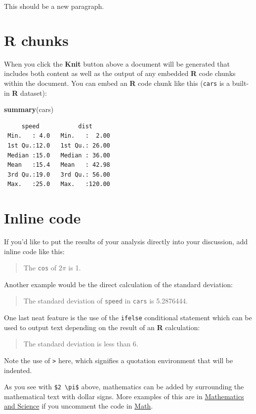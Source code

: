 \documentclass[12pt,twoside]{reedthesis}
\newenvironment{Shaded}{\begin{snugshade}}{\end{snugshade}}
\newcommand{\KeywordTok}[1]{\textcolor[rgb]{0.13,0.29,0.53}{\textbf{#1}}}
\newcommand{\NormalTok}[1]{#1}
\begin{document}
This should be a new paragraph.

\hypertarget{r-chunks}{%
\section{R chunks}\label{r-chunks}}

When you click the \textbf{Knit} button above a document will be generated that includes both content as well as the output of any embedded \textbf{R} code chunks within the document. You can embed an \textbf{R} code chunk like this (\texttt{cars} is a built-in \textbf{R} dataset):
\begin{Shaded}
\begin{Highlighting}[]
\KeywordTok{summary}\NormalTok{(cars)}
\end{Highlighting}
\end{Shaded}
\begin{verbatim}
     speed           dist       
 Min.   : 4.0   Min.   :  2.00  
 1st Qu.:12.0   1st Qu.: 26.00  
 Median :15.0   Median : 36.00  
 Mean   :15.4   Mean   : 42.98  
 3rd Qu.:19.0   3rd Qu.: 56.00  
 Max.   :25.0   Max.   :120.00  
\end{verbatim}
\hypertarget{inline-code}{%
\section{Inline code}\label{inline-code}}

If you'd like to put the results of your analysis directly into your discussion, add inline code like this:
\begin{quote}
The \texttt{cos} of \(2 \pi\) is 1.
\end{quote}
Another example would be the direct calculation of the standard deviation:
\begin{quote}
The standard deviation of \texttt{speed} in \texttt{cars} is 5.2876444.
\end{quote}
One last neat feature is the use of the \texttt{ifelse} conditional statement which can be used to output text depending on the result of an \textbf{R} calculation:
\begin{quote}
The standard deviation is less than 6.
\end{quote}
Note the use of \texttt{\textgreater{}} here, which signifies a quotation environment that will be indented.

As you see with \texttt{\$2\ \textbackslash{}pi\$} above, mathematics can be added by surrounding the mathematical text with dollar signs. More examples of this are in \protect\hyperlink{math-sci}{Mathematics and Science} if you uncomment the code in \protect\hyperlink{math}{Math}.
\end{document}
